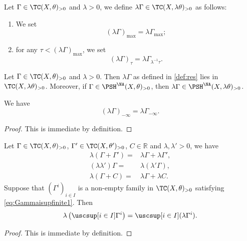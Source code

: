 \begin{definition}\label{def:res}
    Let $\Gamma\in \TC(X,\theta)_{>0}$ and $\lambda>0$, we define $\lambda\Gamma\in \TC(X,\lambda\theta)_{>0}$
    as follows:
    \begin{enumerate}
        \item\label{itm:def:res:1} We set
        \[
        \left(\lambda\Gamma\right)_{\max}=\lambda \Gamma_{\max};
        \]
        \item\label{itm:def:res:2} for any $\tau< \left(\lambda\Gamma\right)_{\max}$, we set
        \[
        (\lambda\Gamma)_{\tau}=\lambda\Gamma_{\lambda^{-1}\tau}.
        \]
    \end{enumerate}
\end{definition}

\begin{proposition}\label{prop:testcurrescaling}
    Let $\Gamma\in \TC(X,\theta)_{>0}$ and $\lambda>0$. Then $\lambda\Gamma$ as defined in \cref{def:res} lies in $\TC(X,\lambda\theta)_{>0}$. Moreover, if $\Gamma\in \PSH^{\NA}(X,\theta)_{>0}$, then $\lambda\Gamma\in \PSH^{\NA}(X,\lambda\theta)_{>0}$.

    We have
    \begin{equation}
        (\lambda\Gamma)_{-\infty}=\lambda \Gamma_{-\infty}.
    \end{equation}
\end{proposition}
\begin{proof}
    This is immediate by definition.
\end{proof}

\begin{proposition}\label{prop:resclacompat}
    Let $\Gamma\in \TC(X,\theta)_{>0}$, $\Gamma'\in \TC(X,\theta')_{>0}$, $C\in \mathbb{R}$ and $\lambda,\lambda'>0$, we have
    \[
        \begin{aligned}
        \lambda(\Gamma+\Gamma')=&\lambda\Gamma+\lambda\Gamma',\\
        (\lambda\lambda')\Gamma=&\lambda(\lambda'\Gamma),\\
        \lambda(\Gamma+C)=&\lambda\Gamma+\lambda C.
        \end{aligned}
    \]
    Suppose that $(\Gamma^i)_{i\in I}$ is a non-empty family in $\TC(X,\theta)_{>0}$ satisfying \eqref{eq:Gammaisupfinite1}. Then
    \[
    \lambda \left( \uscsup[i\in I]\Gamma^i \right)=\uscsup[i\in I](\lambda \Gamma^i).
    \]

\end{proposition}
\begin{proof}
    This is immediate by definition.
\end{proof}

